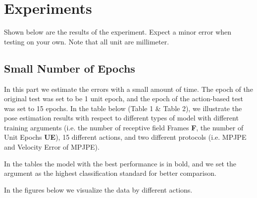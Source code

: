\documentclass[10pt,twocolumn,letterpaper]{article}
\begin{document}

\section{Experiments}

Shown below are the results of the experiment. Expect a minor error when testing on your own. Note that all
unit are millimeter.

\subsection{Small Number of Epochs}

In this part we estimate the errors with a small amount of time. The epoch of the original test was set to 
be 1 unit epoch, and the epoch of the action-based test was set to 15 epochs. In the table below (Table 1 \&
Table 2), we illustrate the pose estimation results with respect to different types of model with different
training arguments (i.e. the number of receptive field Frames \textbf{F}, the number of Unit Epochs \textbf{UE}),
15 different actions, and two different protocols (i.e. MPJPE and Velocity Error of MPJPE).

In the tables the model with the best performance is in bold, and we set the argument as the highest classification standard
for better comparison. 

In the figures below we visualize the data by different actions.
\end{document}
